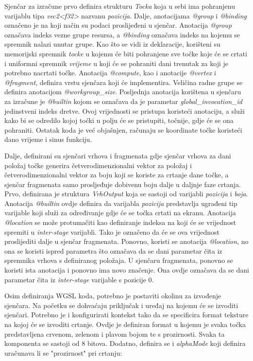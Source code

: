 \documentclass{foi}
\begin{document}
Sjenčar za izračune prvo definira strukturu \textit{Tocka} koja u sebi ima pohranjenu varijablu tipa \textit{vec2<f32>} nazvanu \textit{pozicija}. Dalje, anotacijama \textit{@group} i \textit{@binding} označeno je na koji način su podaci proslijeđeni u sjenčar. Anotacija \textit{@group} označava indeks vezne grupe resursa, a \textit{@binding} označava indeks na kojemu se spremnik nalazi unutar grupe. Kao što se vidi iz deklaracije, korišteni su memorijski spremnik \textit{tocke} u kojemu će biti pohranjene sve točke koje će se crtati i uniformni spremnik \textit{vrijeme} u koji će se pohraniti dani trenutak za koji je potrebno nacrtati točke. Anotacija \textit{@compute}, kao i anotacije \textit{@vertex} i \textit{@fragment}, definira vrstu sjenčara koji će implementira. Veličina radne grupe se definira anotacijom \textit{@workgroup\_size}. Posljednja anotacija korištena u sjenčaru za izračune je \textit{@builtin} kojom se označava da je parametar \textit{global\_invocation\_id} jedinstveni indeks dretve. Ovoj vrijednosti se pristupa koristeći anotaciju, a služi kako bi se odredilo kojoj točki u polju će se pristupiti, točnije, gdje će se ona pohraniti. Ostatak koda je već objašnjen, računaju se koordinate točke koristeći dano vrijeme i sinus funkciju.

Dalje, definirani su sjenčari vrhova i fragmenata gdje sjenčar vrhova za dani položaj točke generira četverodimenzionalni vektor za položaj i četverodimenzionalni vektor za boju koji se koriste za crtanje dane točke, a sjenčar fragmenata samo prosljeđuje dobivenu boju dalje u daljnje faze crtanja.  Prvo, definirana je struktura \textit{VrhOutput} koja se sastoji od varijabli \textit{pozicija} i \textit{boja}. Anotacija \textit{@builtin} ovdje definira da varijabla \textit{pozicija} predstavlja ugrađeni tip varijable koji služi za određivanje gdje će se točka crtati na ekranu. Anotacija \textit{@location} se može protumačiti kao definiranje indeksa na koji će se vrijednost spremiti u \textit{inter-stage} varijabli. Tako je označeno da će se ova vrijednost proslijediti dalje u sjenčar fragmenata. Ponovno, koristi se anotacija \textit{@location}, no ona se koristi ispred parametra što označava da se dani parametar čita iz spremnika vrhova s definiranog položaja. U sjenčaru fragmenata, ponovno se koristi ista anotacija i ponovno ima novo značenje. Ona ovdje označava da se dani parametar čita iz \textit{inter-stage} varijable s pozicije 0.

Osim definiranja WGSL koda, potrebno je postaviti okolinu za izvođenje sjenčara. Na početku se dohvaćaju priključak i uređaj na kojemu će se izvoditi sjenčari. Potrebno je i konfigurirati kontekst tako da se specificira format teksture na kojoj će se izvoditi crtanje. Ovdje je definiran format u kojemu je svaka točka predstavljena crvenom, zelenom i plavom bojom te s prozirnosti. Svaka ta komponenta se sastoji od 8 bitova. Dodatno, definira se i \textit{alphaMode} koji definira uračunava li se "prozirnost" pri crtanju:
\end{document}
